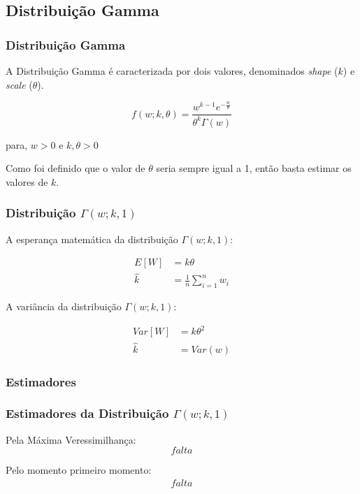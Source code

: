 \subsection{Distribuição Gamma}
\begin{frame}
\frametitle{Distribuição Gamma}

   A Distribuição Gamma é caracterizada por dois valores, denominados
   \textit{shape} ($k$) e \textit{scale} ($\theta$).

\begin{displaymath}
 f(w;k,\theta) = \frac{w^{k-1}e^{-\frac{w}{\theta}}}{\theta^k\Gamma(w)}
\end{displaymath}

para, $ w > 0 $ e $ k,\theta > 0 $ 

Como foi definido que o valor de $\theta$ seria sempre igual a 1,
então basta estimar os valores de $k$.

\end{frame}

\begin{frame}
\frametitle{Distribuição $\Gamma(w;k,1)$}

A esperança matemática da distribuição $\Gamma(w;k,1)$:

\begin{equation}
\label{eq:G_esp}
\begin{align*}
      E[W] &= k\theta \\
      \hat{k} &= \frac{1}{n} \sum_{i=1}^nw_i
    \end{align*}
\end{equation}\pause

A variância da distribuição $\Gamma(w;k,1)$:

\begin{equation}
\label{eq:G_var}
\begin{align*}
       Var[W] &= k\theta^2 \\
      \hat{k} &= Var(w)  
\end{align*}
\end{equation}

\end{frame}

\subsubsection{Estimadores}
\begin{frame}
\frametitle{Estimadores da Distribuição $\Gamma(w;k,1)$}
Pela Máxima Veressimilhança:
\small \begin{equation}
\label{eq:G_MV}
falta
\end{equation} \pause

Pelo momento primeiro momento:
\begin{eqnarray}
\label{eq:G_m_p2}
falta
\end{eqnarray}

\end{frame}

